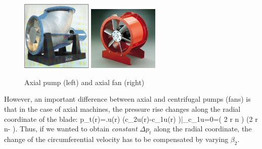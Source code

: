 \begin{figure}[ht]
\begin{center}
\includegraphics[width=0.3\textwidth]{figs/axial_pump1.jpg}
\hspace{1cm}
\includegraphics[width=0.3\textwidth]{figs/axialfanplate.jpg}
\caption{\label{fig:axial_pumps}Axial pump (left) and axial fan (right)}
\end{center}
\end{figure}

However, an important difference between axial and centrifugal pumps (fans) is that in the case of axial machines, the pressure rise changes along the radial coordinate of the blade:
%
\beq
\Delta p_t(r)=\left.\rho u(r) \left(c_{2u}(r)-c_{1u}(r) \right)\right|_{c_{1u}=0}=\rho \left( 2 r \pi n \right) \left(2 r \pi n- \right).
\eeq
%
Thus, if we wanted to obtain \emph{constant} $\Delta p_t$ along the radial coordinate, the change of the circumferential velocity has to be compensated by varying $\beta_2$.

